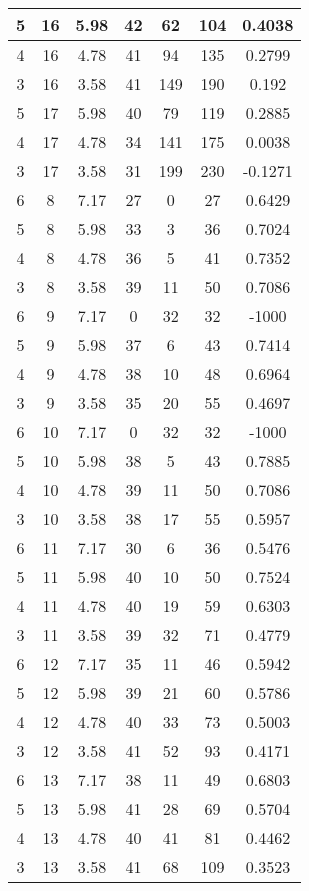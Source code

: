 \documentclass[letterpaper, 12pt]{article}
\begin{document}
\begin{longtable}{|c|c|c|c|c|c|c|}
\hline
5 & 16 & 5.98 & 42 & 62 & 104 & 0.4038 \\
\hline
4 & 16 & 4.78 & 41 & 94 & 135 & 0.2799 \\
\hline
3 & 16 & 3.58 & 41 & 149 & 190 & 0.192 \\
\hline
5 & 17 & 5.98 & 40 & 79 & 119 & 0.2885 \\
\hline
4 & 17 & 4.78 & 34 & 141 & 175 & 0.0038 \\
\hline
3 & 17 & 3.58 & 31 & 199 & 230 & -0.1271 \\
\hline
6 & 8 & 7.17 & 27 & 0 & 27 & 0.6429 \\
\hline
5 & 8 & 5.98 & 33 & 3 & 36 & 0.7024 \\
\hline
4 & 8 & 4.78 & 36 & 5 & 41 & 0.7352 \\
\hline
3 & 8 & 3.58 & 39 & 11 & 50 & 0.7086 \\
\hline
6 & 9 & 7.17 & 0 & 32 & 32 & -1000 \\
\hline
5 & 9 & 5.98 & 37 & 6 & 43 & 0.7414 \\
\hline
4 & 9 & 4.78 & 38 & 10 & 48 & 0.6964 \\
\hline
3 & 9 & 3.58 & 35 & 20 & 55 & 0.4697 \\
\hline
6 & 10 & 7.17 & 0 & 32 & 32 & -1000 \\
\hline
5 & 10 & 5.98 & 38 & 5 & 43 & 0.7885 \\
\hline
4 & 10 & 4.78 & 39 & 11 & 50 & 0.7086 \\
\hline
3 & 10 & 3.58 & 38 & 17 & 55 & 0.5957 \\
\hline
6 & 11 & 7.17 & 30 & 6 & 36 & 0.5476 \\
\hline
5 & 11 & 5.98 & 40 & 10 & 50 & 0.7524 \\
\hline
4 & 11 & 4.78 & 40 & 19 & 59 & 0.6303 \\
\hline
3 & 11 & 3.58 & 39 & 32 & 71 & 0.4779 \\
\hline
6 & 12 & 7.17 & 35 & 11 & 46 & 0.5942 \\
\hline
5 & 12 & 5.98 & 39 & 21 & 60 & 0.5786 \\
\hline
4 & 12 & 4.78 & 40 & 33 & 73 & 0.5003 \\
\hline
3 & 12 & 3.58 & 41 & 52 & 93 & 0.4171 \\
\hline
6 & 13 & 7.17 & 38 & 11 & 49 & 0.6803 \\
\hline
5 & 13 & 5.98 & 41 & 28 & 69 & 0.5704 \\
\hline
4 & 13 & 4.78 & 40 & 41 & 81 & 0.4462 \\
\hline
3 & 13 & 3.58 & 41 & 68 & 109 & 0.3523 \\

\end{longtable}
\end{document}
